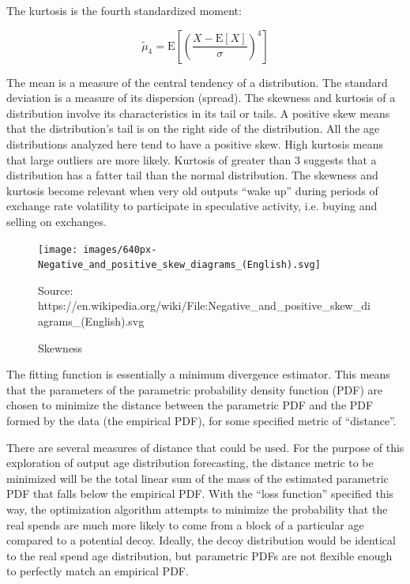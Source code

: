 \documentclass[english]{article}
\begin{document}
The kurtosis is the fourth standardized moment:

\[
\tilde{\mu}_{4}=\mathrm{E}\left[\left(\dfrac{X-\mathrm{E}[X]}{\sigma}\right)^{4}\right]
\]

The mean is a measure of the central tendency of a distribution. The
standard deviation is a measure of its dispersion (spread). The skewness
and kurtosis of a distribution involve its characteristics in its
tail or tails. A positive skew means that the distribution's tail
is on the right side of the distribution. All the age distributions
analyzed here tend to have a positive skew. High kurtosis means that
large outliers are more likely. Kurtosis of greater than 3 suggests
that a distribution has a fatter tail than the normal distribution.
The skewness and kurtosis become relevant when very old outputs \textquotedblleft wake
up\textquotedblright{} during periods of exchange rate volatility
to participate in speculative activity, i.e. buying and selling on
exchanges. 

\begin{figure}

\caption{Skewness }

\begin{centering}
\texttt{[image: images/640px-Negative\_and\_positive\_skew\_diagrams\_(English).svg]}
\par\end{centering}
Source: https://en.wikipedia.org/wiki/File:Negative\_and\_positive\_skew\_diagrams\_(English).svg

\end{figure}

The fitting function is essentially a minimum divergence estimator.
This means that the parameters of the parametric probability density
function (PDF) are chosen to minimize the distance between the parametric
PDF and the PDF formed by the data (the empirical PDF), for some specified
metric of \textquotedblleft distance\textquotedblright . 

There are several measures of distance that could be used. For the
purpose of this exploration of output age distribution forecasting,
the distance metric to be minimized will be the total linear sum of
the mass of the estimated parametric PDF that falls below the empirical
PDF. With the \textquotedblleft loss function\textquotedblright{}
specified this way, the optimization algorithm attempts to minimize
the probability that the real spends are much more likely to come
from a block of a particular age compared to a potential decoy. Ideally,
the decoy distribution would be identical to the real spend age distribution,
but parametric PDFs are not flexible enough to perfectly match an
empirical PDF.
\end{document}
